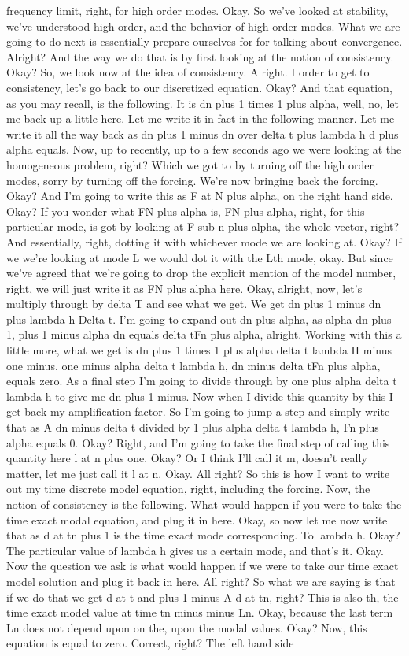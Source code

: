 \documentclass[10pt]{article}
\begin{document}
frequency limit, right, for high order modes. Okay. So we've looked at stability, we've understood high order, and the behavior of high order modes. What we are going to do next is essentially prepare ourselves for for talking about convergence. Alright? And the way we do that is by first looking at the notion of consistency. Okay? So, we look now at the idea of consistency. Alright. I order to get to consistency, let's go back to our discretized equation. Okay? And that equation, as you may recall, is the following. It is dn plus 1 times 1 plus alpha, well, no, let me back up a little here. Let me write it in fact in the following manner. Let me write it all the way back as dn plus 1 minus dn over delta t plus lambda h d plus alpha equals. Now, up to recently, up to a few seconds ago we were looking at the homogeneous problem, right? Which we got to by turning off the high order modes, sorry by turning off the forcing. We're now bringing back the forcing. Okay? And I'm going to write this as F at N plus alpha, on the right hand side. Okay? If you wonder what FN plus alpha is, FN plus alpha, right, for this particular mode, is got by looking at F sub n plus alpha, the whole vector, right? And essentially, right, dotting it with whichever mode we are looking at. Okay? If we we're looking at mode L we would dot it with the Lth mode, okay. But since we've agreed that we're going to drop the explicit mention of the model number, right, we will just write it as FN plus alpha here. Okay, alright, now, let's multiply through by delta T and see what we get. We get dn plus 1 minus dn plus lambda h Delta t. I'm going to expand out dn plus alpha, as alpha dn plus 1, plus 1 minus alpha dn equals delta tFn plus alpha, alright. Working with this a little more, what we get is dn plus 1 times 1 plus alpha delta t lambda H minus one minus, one minus alpha delta t lambda h, dn minus delta tFn plus alpha, equals zero. As a final step I'm going to divide through by one plus alpha delta t lambda h to give me dn plus 1 minus. Now when I divide this quantity by this I get back my amplification factor. So I'm going to jump a step and simply write that as A dn minus delta t divided by 1 plus alpha delta t lambda h, Fn plus alpha equals 0. Okay? Right, and I'm going to take the final step of calling this quantity here l at n plus one. Okay? Or I think I'll call it m, doesn't really matter, let me just call it l at n. Okay. All right? So this is how I want to write out my time discrete model equation, right, including the forcing. Now, the notion of consistency is the following. What would happen if you were to take the time exact modal equation, and plug it in here. Okay, so now let me now write that as d at tn plus 1 is the time exact mode corresponding. To lambda h. Okay? The particular value of lambda h gives us a certain mode, and that's it. Okay. Now the question we ask is what would happen if we were to take our time exact model solution and plug it back in here. All right? So what we are saying is that if we do that we get d at t and plus 1 minus A d at tn, right? This is also th, the time exact model value at time tn minus minus Ln. Okay, because the last term Ln does not depend upon on the, upon the modal values. Okay? Now, this equation is equal to zero. Correct, right? The left hand side 
\end{document}
